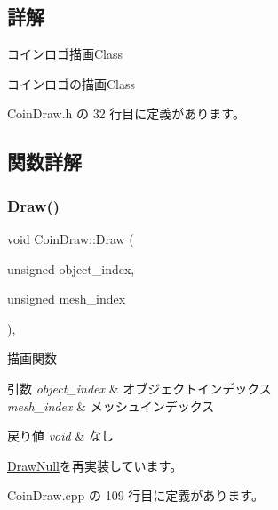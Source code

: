 \subsection{詳解}
コインロゴ描画\+Class 

コインロゴの描画\+Class 

 Coin\+Draw.\+h の 32 行目に定義があります。



\subsection{関数詳解}
\mbox{\label{class_coin_draw_ac7d91fecb6845cebe276eb81a4953563}} 
\subsubsection{\texorpdfstring{Draw()}{Draw()}}
{\footnotesize\ttfamily void Coin\+Draw\+::\+Draw (\begin{DoxyParamCaption}\item[{unsigned}]{object\+\_\+index,  }\item[{unsigned}]{mesh\+\_\+index }\end{DoxyParamCaption})\hspace{0.3cm}{\ttfamily [override]}, {\ttfamily [virtual]}}



描画関数 


\begin{DoxyParams}{引数}
{\em object\+\_\+index} & オブジェクトインデックス \\
\hline
{\em mesh\+\_\+index} & メッシュインデックス \\
\hline
\end{DoxyParams}

\begin{DoxyRetVals}{戻り値}
{\em void} & なし \\
\hline
\end{DoxyRetVals}


\mbox{\hyperlink{class_draw_null_a72ac0b7dc40b1469582419dcc5b0e114}{Draw\+Null}}を再実装しています。



 Coin\+Draw.\+cpp の 109 行目に定義があります。

\mbox{\label{class_coin_draw_a8ebedf2582d53b40016ebd3f0e82c38e}} 

